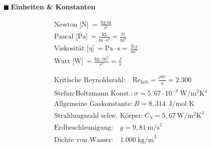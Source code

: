 \documentclass[a4paper,10pt]{article}
\renewcommand{\textbf}[1]{\textsf{{\bfseries {#1}}}}
\newcommand{\m}{\text{m}}
\newcommand{\kg}{\text{kg}}
\newcommand{\s}{\text{s}}
\newcommand\ddfrac[2]{\frac{\displaystyle #1}{\displaystyle #2}}
\renewcommand{\plmtsquare}{{\color{miugray} $\blacksquare~$}}
\begin{document}
\begin{minipage}[t]{.35\textwidth}

\plmtsquare \textbf{Einheiten \& Konstanten}\par \vspace*{-4mm}

\begin{align*}
&\text{Newton [N]} ~	= \frac{\kg \cdot \m}{\s^2} \\
&\text{Pascal [Pa]} ~	= \frac{\kg}{\m \cdot \s^2} = \ddfrac{\text{N}}{\m^2} \\ 
&\text{Viskosität [$\eta$]} ~	= \text{Pa}\cdot \s = \frac{\text{N} \cdot \s}{\m^2} \\ 
&\text{Watt [W]} ~ = \frac{\kg \cdot \m^2}{\s^3} = \frac{J}{s}\\ \\ \\
&\text{Kritische Reynoldszahl:} \quad \text{Re}_{\text{krit}} = \frac{\rho d v}{\eta} = 2.300 \\[-4pt] 
&\text{Stefan-Boltzmann Konst.:} ~\sigma = 5,67 \cdot 10^{-8}~ \text{W}/ \text{m}^{2}\text{K}^{4}\\[1pt]
&\text{Allgemeine Gaskonstante:} ~R = 8,314 ~~\text{J/mol K} \\
&\text{Strahlungszahl schw. Körper:} ~C_S = 5,67~ \text{W}/ \text{m}^{2}\text{K}^{4}\\
&\text{Erdbeschleunigung:} \quad g = 9,81 ~\text{m/s}^2 \\[-1pt]
&\text{Dichte von Wasser:} \quad 1.000 ~\text{kg/m}^3 \\
\end{align*}



\end{minipage}
\end{document}
